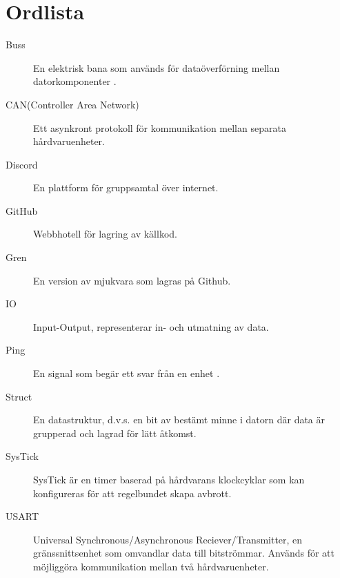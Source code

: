 \section*{Ordlista}
\label{sec:ordlista}
\begin{description}
    \item[Buss]{En elektrisk bana som används för dataöverförning mellan datorkomponenter \cite{collins:2014}.}
    \item[CAN(Controller Area Network)]{Ett asynkront protokoll för kommunikation mellan separata
     hårdvaruenheter\cite[s. 249]{lme:2016}.} %
    \item[Discord]{En plattform för gruppsamtal över internet.}
    \item[GitHub]{Webbhotell för lagring av källkod.}
    \item[Gren]{En version av mjukvara som lagras på Github.}
    \item[IO]{Input-Output, representerar in- och utmatning av data.}
    \item[Ping]{En signal som begär ett svar från en enhet \cite{christensson:2016}.}
    \item[Struct]{En datastruktur, d.v.s. en bit av bestämt minne i datorn där data är grupperad och lagrad för lätt åtkomst.}
    \item[SysTick]SysTick är en timer baserad på hårdvarans klockcyklar som kan konfigureras för att regelbundet skapa avbrott.
    \item[USART]{Universal Synchronous/Asynchronous Reciever/Transmitter, en gränssnittsenhet som omvandlar data till bitströmmar. Används för att möjliggöra kommunikation mellan två hårdvaruenheter\cite{howe:2020}.}

\end{description}